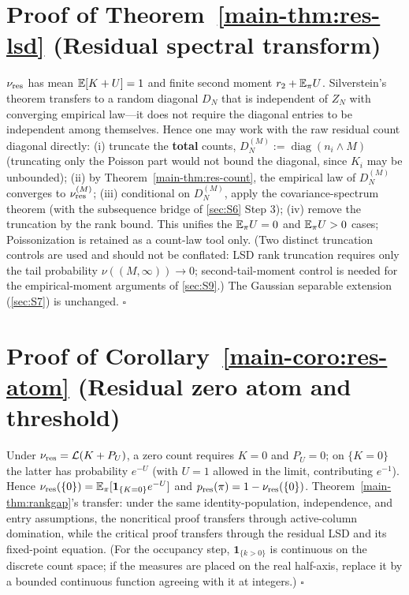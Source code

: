 \section{Proof of Theorem~\ref{main-thm:res-lsd} (Residual spectral transform)}\label{sec:S15}

$\nu_{\rm res}$ has mean $\mathbb{E}[K+U]=1$ and finite second moment $r_2+\mathbb{E}_\pi U$. Silverstein's theorem transfers to a random diagonal $D_N$ that is independent of $Z_N$ with converging empirical law—it does not require the diagonal entries to be independent among themselves. Hence one may work with the raw residual count diagonal directly: (i) truncate the \textbf{total} counts, $D_N^{(M)}:=\operatorname{diag}(n_i\wedge M)$ (truncating only the Poisson part would not bound the diagonal, since $K_i$ may be unbounded); (ii) by Theorem~\ref{main-thm:res-count}, the empirical law of $D_N^{(M)}$ converges to $\nu_{\rm res}^{(M)}$; (iii) conditional on $D_N^{(M)}$, apply the covariance-spectrum theorem (with the subsequence bridge of \ref{sec:S6} Step 3); (iv) remove the truncation by the rank bound. This unifies the $\mathbb{E}_\pi U=0$ and $\mathbb{E}_\pi U>0$ cases; Poissonization is retained as a count-law tool only. (Two distinct truncation controls are used and should not be conflated: LSD rank truncation requires only the tail probability $\nu((M,\infty))\to0$; second-tail-moment control is needed for the empirical-moment arguments of \ref{sec:S9}.) The Gaussian separable extension (\ref{sec:S7}) is unchanged. $\square$

\section{Proof of Corollary~\ref{main-coro:res-atom} (Residual zero atom and threshold)}\label{sec:S16}

Under $\nu_{\rm res}=\mathcal L(K+P_U)$, a zero count requires $K=0$ and $P_U=0$; on $\{K=0\}$ the latter has probability $e^{-U}$ (with $U=1$ allowed in the limit, contributing $e^{-1}$). Hence $\nu_{\rm res}(\{0\})=\mathbb{E}_\pi[\mathbf 1_{\{K=0\}}e^{-U}]$ and $p_{\rm res}(\pi)=1-\nu_{\rm res}(\{0\})$. Theorem~\ref{main-thm:rankgap}'s transfer: under the same identity-population, independence, and entry assumptions, the noncritical proof transfers through active-column domination, while the critical proof transfers through the residual LSD and its fixed-point equation. (For the occupancy step, $\mathbf 1_{\{k>0\}}$ is continuous on the discrete count space; if the measures are placed on the real half-axis, replace it by a bounded continuous function agreeing with it at integers.) $\square$


